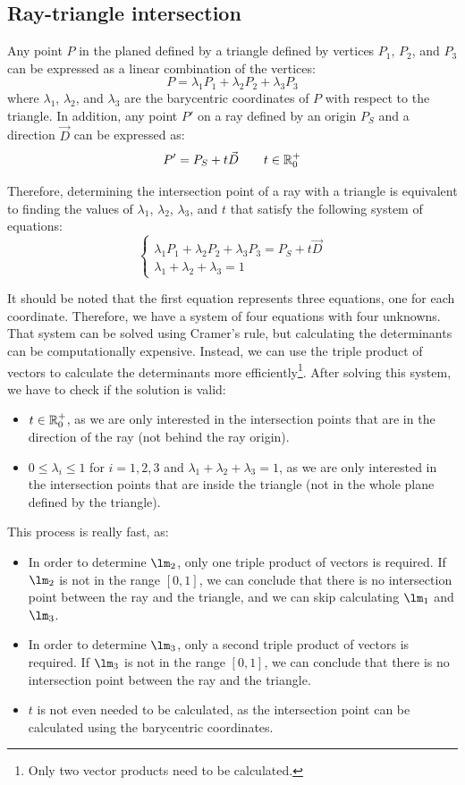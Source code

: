 \subsection{Ray-triangle intersection}

Any point $P$ in the planed defined by a triangle defined by vertices $P_1$, $P_2$, and $P_3$ can be expressed as a linear combination of the vertices:
\[P = \lambda_1 P_1 + \lambda_2 P_2 + \lambda_3 P_3\]
where $\lambda_1$, $\lambda_2$, and $\lambda_3$ are the barycentric coordinates of $P$ with respect to the triangle. In addition, any point $P'$ on a ray defined by an origin $P_S$ and a direction $\vec{D}$ can be expressed as:
\[P' = P_S + t \vec{D}\qquad t\in \mathbb{R}^+_0\]

Therefore, determining the intersection point of a ray with a triangle is equivalent to finding the values of $\lambda_1$, $\lambda_2$, $\lambda_3$, and $t$ that satisfy the following system of equations:
\[\begin{cases}
\lambda_1 P_1 + \lambda_2 P_2 + \lambda_3 P_3 = P_S + t \vec{D} \\
\lambda_1 + \lambda_2 + \lambda_3 = 1
\end{cases}\]

It should be noted that the first equation represents three equations, one for each coordinate. Therefore, we have a system of four equations with four unknowns. That system can be solved using Cramer's rule, but calculating the determinants can be computationally expensive. Instead, we can use the triple product of vectors to calculate the determinants more efficiently\footnote{Only two vector products need to be calculated.}. After solving this system, we have to check if the solution is valid:
\begin{itemize}
    \item $t\in \mathbb{R}^+_0$, as we are only interested in the intersection points that are in the direction of the ray (not behind the ray origin).
    \item $0 \leq \lambda_i \leq 1$ for $i = 1, 2, 3$ and $\lambda_1 + \lambda_2 + \lambda_3 = 1$, as we are only interested in the intersection points that are inside the triangle (not in the whole plane defined by the triangle).
\end{itemize}

This process is really fast, as:
\begin{itemize}
    \item In order to determine $\lm_2$, only one triple product of vectors is required. If $\lm_2$ is not in the range $[0, 1]$, we can conclude that there is no intersection point between the ray and the triangle, and we can skip calculating $\lm_1$ and $\lm_3$.
    \item In order to determine $\lm_3$, only a second triple product of vectors is required. If $\lm_3$ is not in the range $[0, 1]$, we can conclude that there is no intersection point between the ray and the triangle.
    \item $t$ is not even needed to be calculated, as the intersection point can be calculated using the barycentric coordinates.
\end{itemize}


